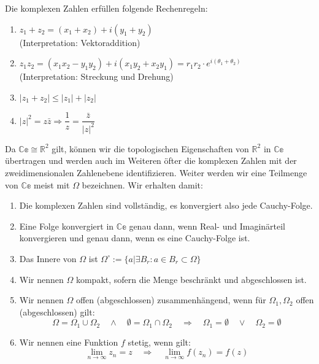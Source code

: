 \documentclass[a4paper, 12pt]{article}          %
\theoremstyle{break}
\theoremstyle{nonumberbreak}
\theoremstyle{break}
\theoremstyle{nonumberbreak}
\newcommand{\R}{\mathbb{R}}
\newcommand{\C}{\mathbb{Ce}}
\begin{document}
    \begin{proposition}
        Die komplexen Zahlen erfüllen folgende Rechenregeln:
        \begin{enumerate}
            \item $z_1+z_2 = (x_1+x_2)+i(y_1+y_2)$ \\(Interpretation: Vektoraddition)
            \item $z_{1}z_2 = (x_1x_2-y_1y_2)+i(x_1y_2+x_2y_1)=r_{1}r_2\cdot e^{i(\theta_1 +\theta_2)}$
            \\(Interpretation: Streckung und Drehung)
            \item $|z_1+z_2|\leq |z_1|+|z_2|$
            \item $|z|^2=z\bar{z}\Rightarrow \dfrac{1}{z} = \dfrac{\bar{z}}{|z|^2}$
        \end{enumerate}
    \end{proposition}

    \begin{definition}
        Da $\C\cong\R^2$ gilt, können wir die topologischen Eigenschaften von $\R^2$ in $\C$ übertragen
        und werden auch im Weiteren öfter die komplexen Zahlen mit der zweidimensionalen Zahlenebene
        identifizieren. Weiter werden wir eine Teilmenge von $\C$ meist mit $\Omega$ bezeichnen.
        Wir erhalten damit:
        \begin{enumerate}
            \item Die komplexen Zahlen sind vollständig, es konvergiert also jede Cauchy-Folge.
            \item Eine Folge konvergiert in $\C$ genau dann, wenn Real- und Imaginärteil konvergieren und genau
            dann, wenn es eine Cauchy-Folge ist.
            \item Das Innere von $\Omega$ ist $\Omega^\circ := \{a|\exists B_r: a\in B_r\subset \Omega\}$
            \item Wir nennen $\Omega$ kompakt, sofern die Menge beschränkt und abgeschlossen ist.
            \item Wir nennen $\Omega$ offen (abgeschlossen) zusammenhängend, wenn für $\Omega_1,\Omega_2$ offen
            (abgeschlossen) gilt:
            $$\Omega =\Omega_1\cup\Omega_2\quad\land\quad \emptyset = \Omega_1\cap \Omega_2\quad\Rightarrow
            \quad \Omega_1 = \emptyset\quad\lor \quad \Omega_2=\emptyset$$
            \item Wir nennen eine Funktion $f$ stetig, wenn gilt:
            $$\lim_{n\to \infty} z_n = z\quad \Rightarrow \quad \lim_{n\to \infty} f(z_n) = f(z)$$
        \end{enumerate}
    \end{definition}
\end{document}
